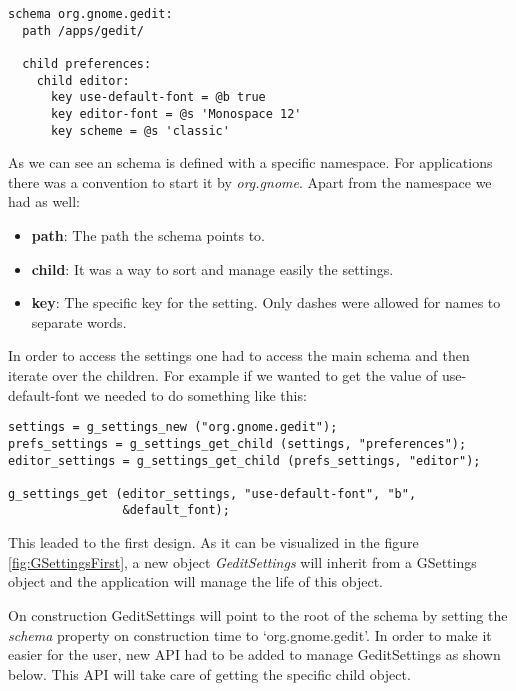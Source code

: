 \begin{lstlisting}[style=GObject]
schema org.gnome.gedit:
  path /apps/gedit/

  child preferences:
    child editor:
      key use-default-font = @b true
      key editor-font = @s 'Monospace 12'
      key scheme = @s 'classic'

\end{lstlisting}

As we can see an schema is defined with a specific namespace. For \GNOME applications there was a convention to start it by \emph{org.gnome}. Apart from the namespace we had as well:
\begin{itemize}
  \item \textbf{path}: The path the schema points to.
  \item \textbf{child}: It was a way to sort and manage easily the settings.
  \item \textbf{key}: The specific key for the setting. Only dashes were allowed for names to separate words.
\end{itemize}

In order to access the settings one had to access the main schema and then iterate over the children. For example if we wanted to get the value of use-default-font we needed to do something like this:

\begin{lstlisting}[style=GObject]
settings = g_settings_new ("org.gnome.gedit");
prefs_settings = g_settings_get_child (settings, "preferences");
editor_settings = g_settings_get_child (prefs_settings, "editor");

g_settings_get (editor_settings, "use-default-font", "b",
                &default_font);
\end{lstlisting}

This leaded to the first design. As it can be visualized in the figure \ref{fig:GSettingsFirst}, a new object \emph{GeditSettings} will inherit from a GSettings object and the application will manage the life of this object.


On construction GeditSettings will point to the root of the schema by setting the \emph{schema} property on construction time to `org.gnome.gedit'.
In order to make it easier for the user, new API had to be added to manage GeditSettings as shown below. This API will take care of getting the specific child object.

